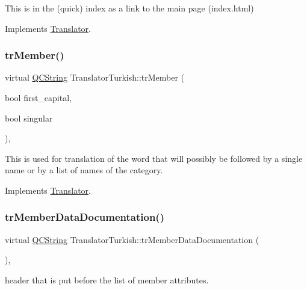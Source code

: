 This is in the (quick) index as a link to the main page (index.\+html) 

Implements \mbox{\hyperlink{class_translator}{Translator}}.

\mbox{\label{class_translator_turkish_a98d6946b81c2630d173832302dbd7f1e}} 
\subsubsection{\texorpdfstring{trMember()}{trMember()}}
{\footnotesize\ttfamily virtual \mbox{\hyperlink{class_q_c_string}{Q\+C\+String}} Translator\+Turkish\+::tr\+Member (\begin{DoxyParamCaption}\item[{bool}]{first\+\_\+capital,  }\item[{bool}]{singular }\end{DoxyParamCaption})\hspace{0.3cm}{\ttfamily [inline]}, {\ttfamily [virtual]}}

This is used for translation of the word that will possibly be followed by a single name or by a list of names of the category. 

Implements \mbox{\hyperlink{class_translator}{Translator}}.

\mbox{\label{class_translator_turkish_acfd79b658d3ba04f32b5bdb6829aac9c}} 
\subsubsection{\texorpdfstring{trMemberDataDocumentation()}{trMemberDataDocumentation()}}
{\footnotesize\ttfamily virtual \mbox{\hyperlink{class_q_c_string}{Q\+C\+String}} Translator\+Turkish\+::tr\+Member\+Data\+Documentation (\begin{DoxyParamCaption}{ }\end{DoxyParamCaption})\hspace{0.3cm}{\ttfamily [inline]}, {\ttfamily [virtual]}}

header that is put before the list of member attributes. 


